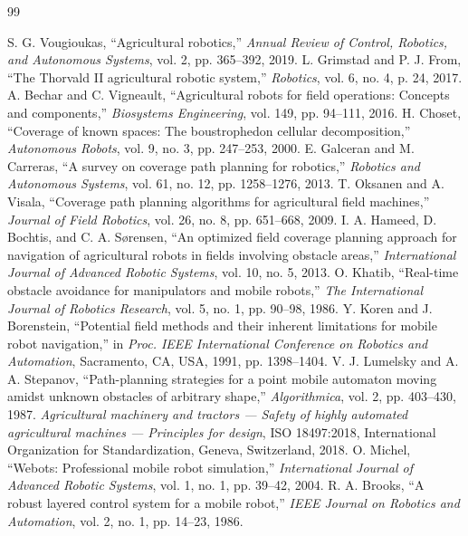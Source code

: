 \documentclass[12pt,a4paper]{article}
\begin{document}
\begin{thebibliography}{99}
\setlength{\itemsep}{2pt}
 S. G. Vougioukas, ``Agricultural robotics,'' \textit{Annual Review of Control, Robotics, and Autonomous Systems}, vol. 2, pp. 365--392, 2019.
 L. Grimstad and P. J. From, ``The Thorvald II agricultural robotic system,'' \textit{Robotics}, vol. 6, no. 4, p. 24, 2017.
 A. Bechar and C. Vigneault, ``Agricultural robots for field operations: Concepts and components,'' \textit{Biosystems Engineering}, vol. 149, pp. 94--111, 2016.
 H. Choset, ``Coverage of known spaces: The boustrophedon cellular decomposition,'' \textit{Autonomous Robots}, vol. 9, no. 3, pp. 247--253, 2000.
 E. Galceran and M. Carreras, ``A survey on coverage path planning for robotics,'' \textit{Robotics and Autonomous Systems}, vol. 61, no. 12, pp. 1258--1276, 2013.
 T. Oksanen and A. Visala, ``Coverage path planning algorithms for agricultural field machines,'' \textit{Journal of Field Robotics}, vol. 26, no. 8, pp. 651--668, 2009.
 I. A. Hameed, D. Bochtis, and C. A. S{\o}rensen, ``An optimized field coverage planning approach for navigation of agricultural robots in fields involving obstacle areas,'' \textit{International Journal of Advanced Robotic Systems}, vol. 10, no. 5, 2013.
 O. Khatib, ``Real-time obstacle avoidance for manipulators and mobile robots,'' \textit{The International Journal of Robotics Research}, vol. 5, no. 1, pp. 90--98, 1986.
 Y. Koren and J. Borenstein, ``Potential field methods and their inherent limitations for mobile robot navigation,'' in \textit{Proc. IEEE International Conference on Robotics and Automation}, Sacramento, CA, USA, 1991, pp. 1398--1404.
 V. J. Lumelsky and A. A. Stepanov, ``Path-planning strategies for a point mobile automaton moving amidst unknown obstacles of arbitrary shape,'' \textit{Algorithmica}, vol. 2, pp. 403--430, 1987.
 \textit{Agricultural machinery and tractors --- Safety of highly automated agricultural machines --- Principles for design}, ISO 18497:2018, International Organization for Standardization, Geneva, Switzerland, 2018.
 O. Michel, ``Webots: Professional mobile robot simulation,'' \textit{International Journal of Advanced Robotic Systems}, vol. 1, no. 1, pp. 39--42, 2004.
 R. A. Brooks, ``A robust layered control system for a mobile robot,'' \textit{IEEE Journal on Robotics and Automation}, vol. 2, no. 1, pp. 14--23, 1986.

\end{thebibliography}
\end{document}
